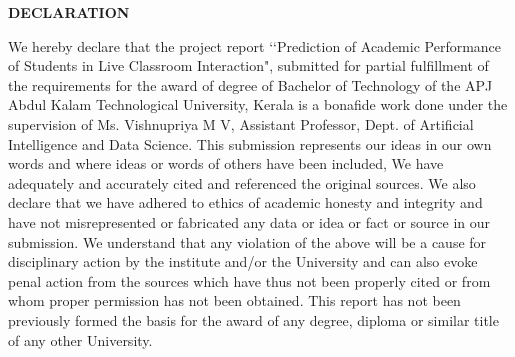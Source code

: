 
\newpage
\thispagestyle{empty}


\begin{center}
\vspace*{1cm}
\large \textbf{DECLARATION}
\end{center}
\vspace*{1cm}
\begin{doublespace}
We hereby declare that the project report ‘‘Prediction of Academic Performance of Students in Live Classroom
Interaction", submitted for partial fulfillment of the requirements for the award of degree of Bachelor of Technology of the APJ Abdul Kalam Technological University, Kerala is a bonafide work done under the supervision of  Ms. Vishnupriya M V, Assistant Professor, Dept. of Artificial Intelligence and Data Science. This submission represents our ideas in our own words and where ideas or words of others have been included, We have adequately and accurately cited and referenced the original sources. We also declare that we have adhered to ethics of academic honesty and integrity and have not misrepresented or fabricated any data or idea or fact or source in our submission. We understand that any violation of the above will be a cause for disciplinary action by the institute and/or the University and can also evoke penal action from the sources which have thus not been properly cited or from whom proper permission has not been obtained. This report has not been previously formed the basis for the award of any degree, diploma or similar title of any other University.
\end{doublespace}

